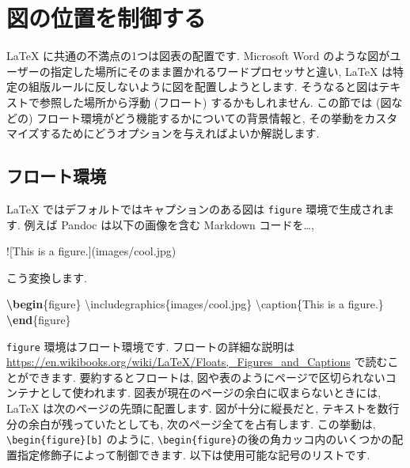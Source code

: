 \documentclass[
  11pt,
  lualatex,ja=standard,jafont=noto]{bxjsreport}
\newenvironment{Shaded}{\begin{snugshade}}{\end{snugshade}}
\newcommand{\AlertTok}[1]{\textcolor[rgb]{0.94,0.16,0.16}{#1}}
\newcommand{\BuiltInTok}[1]{#1}
\newcommand{\ExtensionTok}[1]{#1}
\newcommand{\FunctionTok}[1]{\textcolor[rgb]{0.00,0.00,0.00}{#1}}
\newcommand{\KeywordTok}[1]{\textcolor[rgb]{0.13,0.29,0.53}{\textbf{#1}}}
\newcommand{\NormalTok}[1]{#1}
\begin{document}
\hypertarget{figure-placement}{%
\section{図の位置を制御する}\label{figure-placement}}

LaTeX に共通の不満点の1つは図表の配置です. Microsoft Word のような図がユーザーの指定した場所にそのまま置かれるワードプロセッサと違い, LaTeX は特定の組版ルールに反しないように図を配置しようとします. そうなると図はテキストで参照した場所から浮動 (フロート) するかもしれません. この節では (図などの) フロート環境がどう機能するかについての背景情報と, その挙動をカスタマイズするためにどうオプションを与えればよいか解説します.

\hypertarget{floating-environment}{%
\subsection{フロート環境}\label{floating-environment}}

LaTeX ではデフォルトではキャプションのある図は \texttt{figure} 環境で生成されます. 例えば Pandoc は以下の画像を含む Markdown コードを\ldots,

\begin{Shaded}
\begin{Highlighting}[]
\AlertTok{![This is a figure.](images/cool.jpg)}
\end{Highlighting}
\end{Shaded}

こう変換します.

\begin{Shaded}
\begin{Highlighting}[]
\KeywordTok{\textbackslash{}begin}\NormalTok{\{}\ExtensionTok{figure}\NormalTok{\}}
  \BuiltInTok{\textbackslash{}includegraphics}\NormalTok{\{}\ExtensionTok{images/cool.jpg}\NormalTok{\}}
  \FunctionTok{\textbackslash{}caption}\NormalTok{\{This is a figure.\}}
\KeywordTok{\textbackslash{}end}\NormalTok{\{}\ExtensionTok{figure}\NormalTok{\}}
\end{Highlighting}
\end{Shaded}

\texttt{figure} 環境はフロート環境です. フロートの詳細な説明は \url{https://en.wikibooks.org/wiki/LaTeX/Floats,_Figures_and_Captions} で読むことができます. 要約するとフロートは, 図や表のようにページで区切られないコンテナとして使われます. 図表が現在のページの余白に収まらないときには, LaTeX は次のページの先頭に配置します. 図が十分に縦長だと, テキストを数行分の余白が残っていたとしても, 次のページ全てを占有します. この挙動は, \texttt{\textbackslash{}begin\{figure\}{[}b{]}} のように, \texttt{\textbackslash{}begin\{figure\}}の後の角カッコ内のいくつかの配置指定修飾子によって制御できます. 以下は使用可能な記号のリストです.
\end{document}
